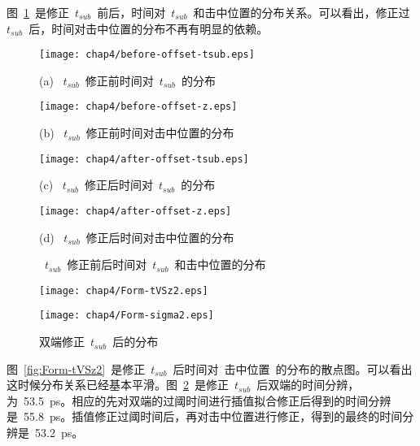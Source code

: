 图~\ref{fig:Fit-Tsub}~是修正~$t_{sub}$~前后，时间对~$t_{sub}$~和击中位置的分布关系。可以看出，修正过~$t_{sub}$~后，时间对击中位置的分布不再有明显的依赖。
\begin{figure}[!h]
\begin{minipage}{0.5\linewidth}
  \centerline{\texttt{[image: chap4/before-offset-tsub.eps]}}
  \centerline{(a) ~$t_{sub}$~修正前时间对~$t_{sub}$~的分布}
  \centerline{\label{fig:before-offset-tsub}}
\end{minipage}
\hfill
\begin{minipage}{0.5\linewidth}
  \centerline{\texttt{[image: chap4/before-offset-z.eps]}}
  \centerline{(b) ~$t_{sub}$~修正前时间对击中位置的分布}
  \centerline{\label{fig:before-offset-z}}
\end{minipage}
\vfill
\begin{minipage}{0.5\linewidth}
  \centerline{\texttt{[image: chap4/after-offset-tsub.eps]}}
  \centerline{(c) ~$t_{sub}$~修正后时间对~$t_{sub}$~的分布}
  \centerline{\label{fig:after-offset-tsub}}
\end{minipage}
\hfill
\begin{minipage}{0.5\linewidth}
  \centerline{\texttt{[image: chap4/after-offset-z.eps]}}
  \centerline{(d) ~$t_{sub}$~修正后时间对击中位置的分布}
  \centerline{\label{fig:after-offset-z}}
\end{minipage}
\caption{~$t_{sub}$~修正前后时间对~$t_{sub}$~和击中位置的分布}
\label{fig:Fit-Tsub}
\end{figure}

\begin{figure}[!h]
\begin{minipage}[!h]{0.5\linewidth}
\texttt{[image: chap4/Form-tVSz2.eps]}
\label{fig:Form-tVSz2}
\end{minipage}%
\hfill
\begin{minipage}[!h]{0.5\linewidth}
\texttt{[image: chap4/Form-sigma2.eps]}
\label{fig:Form-sigma2}
\end{minipage}
\caption{双端修正~$t_{sub}$~后的分布}
\end{figure}

图~\ref{fig:Form-tVSz2}~是修正~$t_{sub}$~后时间对~击中位置~的分布的散点图。可以看出这时候分布关系已经基本平滑。图~\ref{fig:Form-sigma2}~是修正~$t_{sub}$~后双端的时间分辨，为~53.5~ps。相应的先对双端的过阈时间进行插值拟合修正后得到的时间分辨是~55.8~ps。插值修正过阈时间后，再对击中位置进行修正，得到的最终的时间分辨是~53.2~ps。

